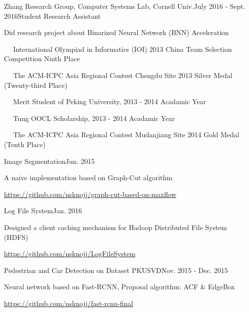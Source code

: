\documentclass{joel_cv}
\begin{document}
\begin{sectionContentNormal}{Zhang Research Group, Computer Systems Lab, Cornell Univ.}{July 2016 - Sept. 2016}{Student Research Assistant}
	\item Did research project about Binarized Neural Network (BNN) Acceleration
\end{sectionContentNormal}


%
%

\begin{description}{}
	\item{\ \ } International Olympiad in Informatics (IOI) 2013 China Team Selection Competition Ninth Place
	\item{\ \ } The ACM-ICPC Asia Regional Contest Chengdu Site 2013 Silver Medal (Twenty-third Place)
	\item{\ \ } Merit Student of Peking University, 2013 - 2014 Acadamic Year
	\item{\ \ } Tung OOCL Scholarship, 2013 - 2014 Acadamic Year
	\item{\ \ } The ACM-ICPC Asia Regional Contest Mudanjiang Site 2014 Gold Medal (Tenth Place)
\end{description}


%
%


\begin{sectionContentSimple}{Image Segmentation}{Jun. 2015}
\item A naive implementation based on Graph-Cut algorithm
\item \url{https://github.com/nsknojj/graph-cut-based-on-maxflow}
\end{sectionContentSimple}

\begin{sectionContentSimple}{Log File System}{Jan. 2016}
\item Designed a client caching mechanism for Hadoop Distributed File System (HDFS)
\item \url{https://github.com/nsknojj/LogFileSystem}
\end{sectionContentSimple}

\begin{sectionContentSimple}{Pedestrian and Car Detection on Dataset PKUSVD}{Nov. 2015 - Dec. 2015}
\item Neural network based on Fast-RCNN, Proposal algorithm: ACF \& EdgeBox
\item \url{https://github.com/nsknojj/fast-rcnn-final}
\end{sectionContentSimple}
\end{document}
